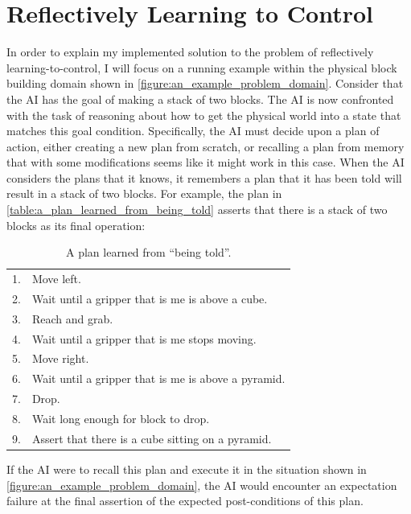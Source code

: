 \chapter{Reflectively Learning to Control}
\label{chapter:reflectively_learning_to_control}

In order to explain my implemented solution to the problem of
reflectively learning-to-control, I will focus on a running example
within the physical block building domain shown in
\autoref{figure:an_example_problem_domain}.  Consider that the AI has
the goal of making a stack of two blocks.  The AI is now confronted
with the task of reasoning about how to get the physical world into a
state that matches this goal condition.  Specifically, the AI must
decide upon a plan of action, either creating a new plan from scratch,
or recalling a plan from memory that with some modifications seems
like it might work in this case.  When the AI considers the plans that
it knows, it remembers a plan that it has been told will result in a
stack of two blocks.  For example, the plan in
{\mbox{\autoref{table:a_plan_learned_from_being_told}}} asserts that
there is a stack of two blocks as its final operation:
\begin{table}[h]
\centering
\begin{tabular}{|rl|}
\hline
 1. & Move left.\\
 2. & Wait until a gripper that is me is above a cube.\\
 3. & Reach and grab.\\
 4. & Wait until a gripper that is me stops moving.\\
 5. & Move right.\\
 6. & Wait until a gripper that is me is above a pyramid.\\
 7. & Drop.\\
 8. & Wait long enough for block to drop.\\
 9. & Assert that there is a cube sitting on a pyramid.\\
\hline
\end{tabular}
\caption[A plan learned from ``being told''.]{A plan learned from
  ``being told''.}
\label{table:a_plan_learned_from_being_told}
\end{table}
If the AI were to recall this plan and execute it in the situation
shown in \autoref{figure:an_example_problem_domain}, the AI would
encounter an expectation failure at the final assertion of the
expected post-conditions of this plan.
